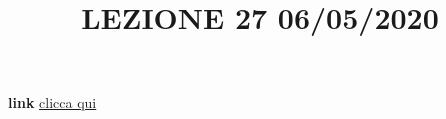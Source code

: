\newline
\newline
\title{LEZIONE 27 06/05/2020}\newline
\textbf{link} \href{https://web.microsoftstream.com/video/bdd007a6-2e96-4b45-99a9-7b7021538ffd?list=user&userId=faa91214-a6f5-40d7-8875-253fd49b8ce1}{clicca qui}